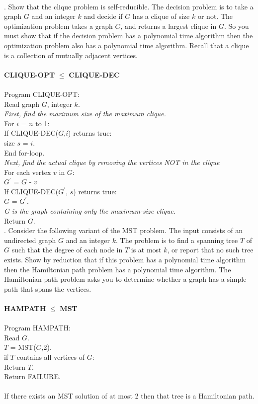 \documentclass[10pt]{article}
\newcommand{\tab}{\hspace*{2em}}
\newcommand{\tabb}{\hspace*{4em}}
\newcommand{\tabbb}{\hspace*{6em}}
\begin{document}
	\\
    .		Show that the clique problem is self-reducible.  The decision problem is to take a graph $G$ and an
				integer $k$ and decide if $G$ has a clique of size $k$ or not. The optimization problem takes a graph $G$, and
				returns a largest clique in $G$.  So you must show that if the decision problem has a polynomial time
				algorithm then the optimization problem also has a polynomial time algorithm. Recall that a clique is
				a collection of mutually adjacent vertices.
	\\
	\\
	\textbf{CLIQUE-OPT} $\leq$ \textbf{CLIQUE-DEC}\\
	\\
	Program CLIQUE-OPT:\\
	\tab Read graph $G$, integer $k$.\\
	\tab \emph{First, find the maximum size of the maximum clique.}\\
	\tab For $i$ = $n$ to 1:\\
	\tabb If CLIQUE-DEC($G$,$i$) returns true:\\
	\tabbb size $s$ = $i$.\\
	\tabbb End for-loop.\\
	\tab \emph{Next, find the actual clique by removing the vertices NOT in the clique}\\
	\tab For each vertex $v$ in $G$:\\
	\tab  $G^\prime$ = $G$ - $v$\\
	\tabb If CLIQUE-DEC($G^\prime$, $s$) returns true:\\
	\tabbb $G$ = $G^\prime$.\\
	\tab \emph{G is the graph containing only the maximum-size clique.}\\
	\tab Return $G$.\\
	.	Consider the following variant of the MST problem. The input consists of an undirected graph $G$ and
			an integer $k$. The problem is to find a spanning tree $T$ of $G$ such that the degree of each node in $T$ is
			at most $k$, or report that no such tree exists. Show by reduction that if this problem has a polynomial
			time algorithm then the Hamiltonian path problem has a polynomial time algorithm. The Hamiltonian
			path problem asks you to determine whether a graph has a simple path that spans the vertices.
	\\
	\\
	\textbf{HAMPATH} $\leq$ \textbf{MST}\\
	\\
	Program HAMPATH:\\
	\tab Read $G$.\\
	\tab $T$ = MST($G$,2).\\
	\tab if $T$ contains all vertices of $G$:\\
	\tabb Return $T$.\\
	\tab Return FAILURE.\\
	\\
	If there exists an MST solution of at most 2 then that tree is a Hamiltonian path. 
\end{document}
